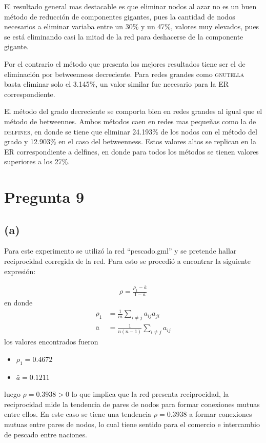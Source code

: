 \documentclass[letterpaper]{article}
\begin{document}
El resultado general mas destacable es que eliminar nodos al azar no es un buen método de reducción de componentes gigantes, pues la cantidad de nodos necesarios a eliminar variaba entre un 30\% y un 47\%, valores muy elevados, pues se está eliminando casi la mitad de la red para deshacerse de la componente gigante.

Por el contrario el método que presenta los mejores resultados tiene ser el de eliminación por betweenness decreciente. Para redes grandes como \textsc{gnutella} basta eliminar solo el 3.145\%, un valor similar fue necesario para la ER correspondiente.

El método del grado decreciente se comporta bien en redes grandes al igual que el método de betweennes. Ambos métodos caen en redes mas pequeñas como la de \textsc{delfines}, en donde se tiene que eliminar 24.193\% de los nodos con el método del grado y 12.903\% en el caso del betweenness. Estos valores altos se replican en la ER correspondiente a delfines, en donde para todos los métodos se tienen valores superiores a los 27\%.

\section{Pregunta 9}

\subsection*{(a)}
Para este experimento se utilizó la red ``pescado.gml'' y se pretende hallar reciprocidad corregida de la red. Para esto se procedió a encontrar la siguiente expresión:

\begin{align}
  \rho = \frac{\rho_1 - \bar{a}}{1 - \bar{a}}
\end{align}
en donde
\begin{align}
  \rho_1 &= \frac{1}{m}\sum_{i \neq j} a_{ij}a_{ji} \\
  \bar{a} &= \frac{1}{n(n-1)}\sum_{i \neq j} a_{ij}
\end{align}
los valores encontrados fueron
\begin{itemize}
  \item $\rho_1  =  0.4672$
  \item $\bar{a} = 0.1211$
\end{itemize}
luego $\rho = 0.3938 > 0$ lo que implica que la red presenta reciprocidad, la reciprocidad mide la tendencia de pares de nodos para formar conexiones mutuas entre ellos. En este caso se tiene una tendencia $\rho = 0.3938$ a formar conexiones mutuas entre pares de nodos, lo cual tiene sentido para el comercio e intercambio de pescado entre naciones.
\end{document}
